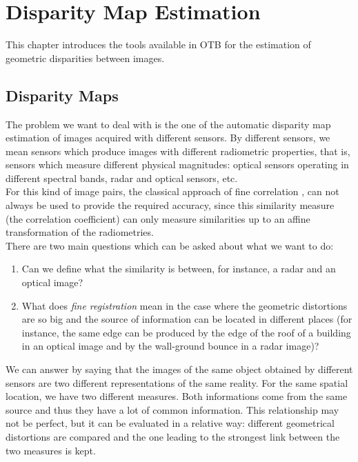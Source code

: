 \chapter{Disparity Map Estimation}


This chapter introduces the tools available in OTB for the estimation
of geometric disparities between images.


\section{Disparity Maps}
\ifitkFullVersion
\label{sec:DisparityMaps}
\fi

The problem we want to deal with is the one of the
automatic disparity map estimation of images acquired with different sensors. By different
sensors, we mean sensors which produce images with different
radiometric properties, that is, sensors which measure different
physical magnitudes: optical sensors operating in different spectral
bands, radar and optical sensors, etc.\\

For this kind of image pairs, the classical approach of fine
correlation \cite{correl1,correl2}, can not always be used to
provide the required accuracy, since this similarity measure (the correlation
coefficient) can only measure similarities up to an affine
transformation of the radiometries.\\

There are two main questions which can be asked about what we want to
do:
\begin{enumerate}
\item Can we define what the similarity is between, for instance, a radar
and an optical image?
\item What does {\em fine registration} mean in the case where the
geometric distortions are so big and the source of information can be
located in different places (for instance, the same edge can be
produced by the edge of the roof of a building in an optical image and
by the wall-ground bounce in a radar image)?
\end{enumerate}

We can answer by saying that the images of the same object obtained by different
sensors are two different representations of the same reality. For the
same spatial location, we have two different measures. Both informations
come from the same source and thus they have a lot of common
information. This relationship may not be perfect, but it can be
evaluated in a relative way: different geometrical distortions are
compared and the one leading to the strongest link between the two
measures is kept.\\


